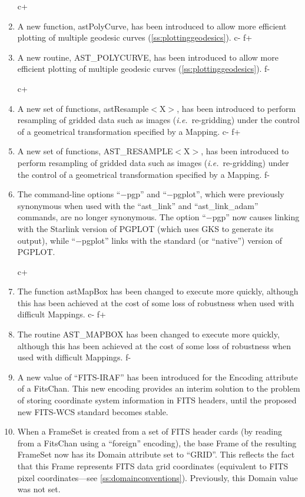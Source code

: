 \documentclass[twoside,11pt]{article}
\newcommand{\secref}[1]{\S\ref{#1}}
\renewcommand{\secref}[1]{\ref{#1}}
\begin{document}
\begin{enumerate}
c+
\item A new function, astPolyCurve, has been introduced to allow more
efficient plotting of multiple geodesic curves
(\secref{ss:plottinggeodesics}).
c-
f+
\item A new routine, AST\_POLYCURVE, has been introduced to allow more
efficient plotting of multiple geodesic curves
(\secref{ss:plottinggeodesics}).
f-

c+
\item A new set of functions, astResample$<$X$>$, has been introduced
to perform resampling of gridded data such as images
({\em{i.e.}}\ re-gridding) under the control of a geometrical
transformation specified by a Mapping.
c-
f+
\item A new set of functions, AST\_RESAMPLE$<$X$>$, has been
introduced to perform resampling of gridded data such as images
({\em{i.e.}}\ re-gridding) under the control of a geometrical
transformation specified by a Mapping.
f-

\item The command-line options ``$-$pgp'' and ``$-$pgplot'', which
were previously synonymous when used with the ``ast\_link'' and
``ast\_link\_adam'' commands, are no longer synonymous. The option
``$-$pgp'' now causes linking with the Starlink version of PGPLOT
(which uses GKS to generate its output), while ``$-$pgplot'' links
with the standard (or ``native'') version of PGPLOT.

c+
\item The function astMapBox has been changed to execute more quickly,
although this has been achieved at the cost of some loss of robustness
when used with difficult Mappings.
c-
f+
\item The routine AST\_MAPBOX has been changed to execute more
quickly, although this has been achieved at the cost of some loss of
robustness when used with difficult Mappings.
f-

\item A new value of ``FITS-IRAF'' has been introduced for the
Encoding attribute of a FitsChan. This new encoding provides an
interim solution to the problem of storing coordinate system
information in FITS headers, until the proposed new FITS-WCS standard
becomes stable.

\item When a FrameSet is created from a set of FITS header cards (by
reading from a FitsChan using a ``foreign'' encoding), the base Frame
of the resulting FrameSet now has its Domain attribute set to
``GRID''. This reflects the fact that this Frame represents FITS data
grid coordinates (equivalent to FITS pixel coordinates---see
\secref{ss:domainconventions}). Previously, this Domain value was not
set.


\end{enumerate}
\end{document}
